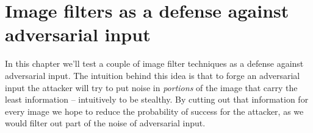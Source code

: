 \chapter{Image filters as a defense against adversarial input}

In this chapter we'll test a couple of image filter techniques as a
defense against adversarial input. The intuition behind this idea is
that to forge an adversarial input the attacker will try to put noise
in \emph{portions} of the image that carry the least information --
intuitively to be stealthy. By cutting out that information for every
image we hope to reduce the probability of success for the attacker, as
we would filter out part of the noise of adversarial input.
